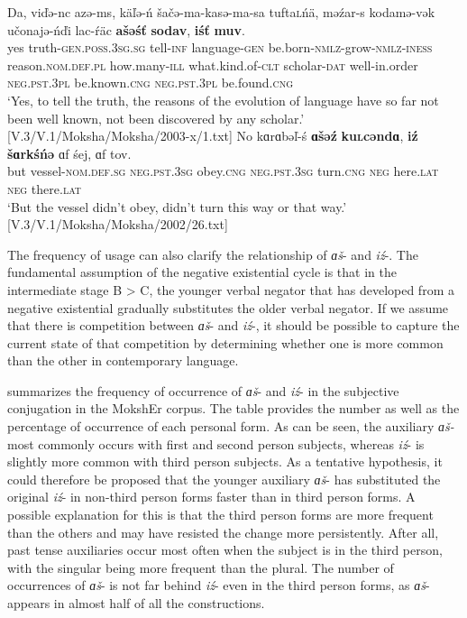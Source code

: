 \documentclass[output=paper]{langsci/langscibook}
\begin{document}
\ea\label{ex:moksha-evolution}
\gll Da, viďə-nc azə-ms, käľə-ń šačə-ma-kasə-ma-sa tufta\textsc{l}ńä, məźar-s kodamə-vək učonajə-ńďi lac-ŕäc \textbf{ašəśť} \textbf{sodav}, \textbf{iśť} \textbf{muv}.\\
yes truth-\textsc{gen.poss.3sg.sg} tell-\textsc{inf} language-\textsc{gen} be.born-\textsc{nmlz}-grow-\textsc{nmlz-iness} reason.\textsc{nom.def.pl}  how.many-\textsc{ill}    what.kind.of-\textsc{clt} scholar-\textsc{dat} well-in.order \textsc{neg.pst.3pl} be.known.\textsc{cng} \textsc{neg.pst.3pl} be.found.\textsc{cng}\\
\glt `Yes, to tell the truth, the reasons of the evolution of language have so far not been well known, not been discovered by any scholar.' [V.3/V.1/Moksha/Moksha/2003-x/1.txt]
\z
\ea\label{ex:moksha-vessel}
\gll No kɑrɑbəľ-ś \textbf{ɑšəź} \textbf{ku\textsc{l}cəndɑ}, \textbf{iź} \textbf{šɑrkśńə} ɑf śej, ɑf tov.\\
but vessel-\textsc{nom.def.sg} \textsc{neg.pst.3sg} obey.\textsc{cng} 
\textsc{neg.pst.3sg} turn.\textsc{cng} \textsc{neg} here.\textsc{lat} \textsc{neg}    there.\textsc{lat}\\
\glt `But the vessel didn't obey, didn't turn this way or that way.' [V.3/V.1/Moksha/Moksha/2002/26.txt]
\z

  The frequency of usage can also clarify the relationship of \textit{ɑš}- and \textit{iź}-. The fundamental assumption of the negative existential cycle is that in the intermediate stage B > C, the younger verbal negator that has developed from a negative existential gradually substitutes the older verbal negator. If we assume that there is competition between \textit{ɑš}- and \textit{iź}-, it should be possible to capture the current state of that competition by determining whether one is more common than the other in contemporary language. 

   summarizes the frequency of occurrence of \textit{ɑš}- and \textit{iź}- in the subjective conjugation in the MokshEr corpus. The table provides the number as well as the percentage of occurrence of each personal form. As can be seen, the auxiliary \textit{ɑš-} most commonly occurs with first and second person subjects, whereas \textit{iź}- is slightly more common with third person subjects. As a tentative hypothesis, it could therefore be proposed that the younger auxiliary \textit{ɑš}- has substituted the original \textit{iź}- in non-third person forms faster than in third person forms. A possible explanation for this is that the third person forms are more frequent than the others and may have resisted the change more persistently. After all, past tense auxiliaries occur most often when the subject is in the third person, with the singular being more frequent than the plural. The number of occurrences of \textit{ɑš}- is not far behind \textit{iź}- even in the third person forms, as \textit{ɑš}- appears in almost half of all the constructions.
\end{document}
